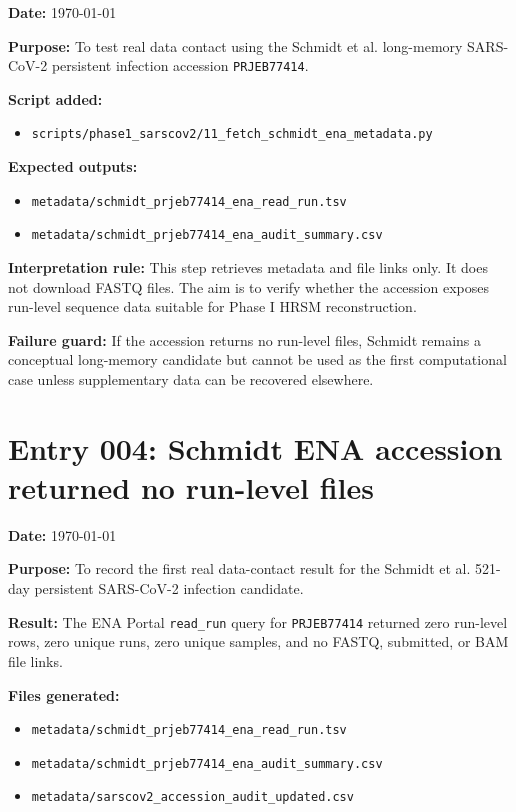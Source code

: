 \textbf{Date:} \today

\textbf{Purpose:} To test real data contact using the Schmidt et al. long-memory SARS-CoV-2 persistent infection accession \texttt{PRJEB77414}.

\textbf{Script added:}
\begin{itemize}
    \item \texttt{scripts/phase1\_sarscov2/11\_fetch\_schmidt\_ena\_metadata.py}
\end{itemize}

\textbf{Expected outputs:}
\begin{itemize}
    \item \texttt{metadata/schmidt\_prjeb77414\_ena\_read\_run.tsv}
    \item \texttt{metadata/schmidt\_prjeb77414\_ena\_audit\_summary.csv}
\end{itemize}

\textbf{Interpretation rule:} This step retrieves metadata and file links only. It does not download FASTQ files. The aim is to verify whether the accession exposes run-level sequence data suitable for Phase I HRSM reconstruction.

\textbf{Failure guard:} If the accession returns no run-level files, Schmidt remains a conceptual long-memory candidate but cannot be used as the first computational case unless supplementary data can be recovered elsewhere.


\section*{Entry 004: Schmidt ENA accession returned no run-level files}

\textbf{Date:} \today

\textbf{Purpose:} To record the first real data-contact result for the Schmidt et al. 521-day persistent SARS-CoV-2 infection candidate.

\textbf{Result:} The ENA Portal \texttt{read\_run} query for \texttt{PRJEB77414} returned zero run-level rows, zero unique runs, zero unique samples, and no FASTQ, submitted, or BAM file links.

\textbf{Files generated:}
\begin{itemize}
    \item \texttt{metadata/schmidt\_prjeb77414\_ena\_read\_run.tsv}
    \item \texttt{metadata/schmidt\_prjeb77414\_ena\_audit\_summary.csv}
    \item \texttt{metadata/sarscov2\_accession\_audit\_updated.csv}
\end{itemize}

